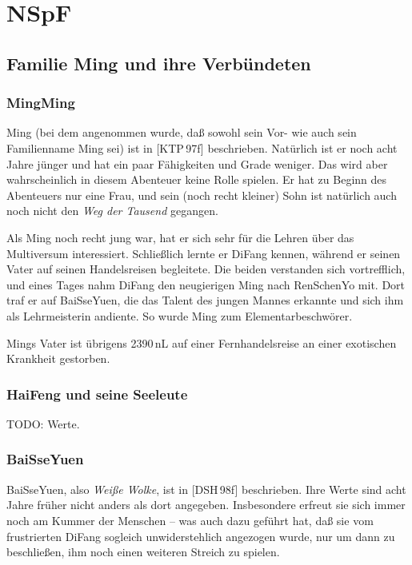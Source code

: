 \documentclass[
a4paper,
twoside,
DIV=calc,
BCOR=4mm,
fontsize=9pt,
twocolumn=on,
titlepage=on,
parskip=half
]{scrartcl}
\begin{document}
\section{NSpF}

\subsection{Familie Ming und ihre Verbündeten}

\subsubsection{MingMing}

Ming (bei dem angenommen wurde, daß sowohl sein Vor- wie auch sein
Familienname Ming sei) ist in [KTP\,97f] beschrieben. Natürlich ist er
noch acht Jahre jünger und hat ein paar Fähigkeiten und Grade
weniger. Das wird aber wahrscheinlich in diesem Abenteuer keine Rolle
spielen. Er hat zu Beginn des Abenteuers nur eine Frau, und sein (noch
recht kleiner) Sohn ist natürlich auch noch nicht den \emph{Weg der
  Tausend} gegangen.

Als Ming noch recht jung war, hat er sich sehr für die Lehren über das
Multiversum interessiert. Schließlich lernte er DiFang kennen, während
er seinen Vater auf seinen Handelsreisen begleitete. Die beiden
verstanden sich vortrefflich, und eines Tages nahm DiFang den
neugierigen Ming nach RenSchenYo mit. Dort traf er auf BaiSseYuen, die
das Talent des jungen Mannes erkannte und sich ihm als Lehrmeisterin
andiente. So wurde Ming zum Elementarbeschwörer.

Mings Vater ist übrigens 2390\,nL auf einer Fernhandelsreise an einer
exotischen Krankheit gestorben.

\subsubsection{HaiFeng und seine Seeleute}

TODO: Werte.

\subsubsection{BaiSseYuen}

BaiSseYuen, also \emph{Weiße Wolke}, ist in [DSH\,98f]
beschrieben. Ihre Werte sind acht Jahre früher nicht anders als dort
angegeben. Insbesondere erfreut sie sich immer noch am Kummer der
Menschen -- was auch dazu geführt hat, daß sie vom frustrierten DiFang
sogleich unwiderstehlich angezogen wurde, nur um dann zu beschließen,
ihm noch einen weiteren Streich zu spielen.
\end{document}
